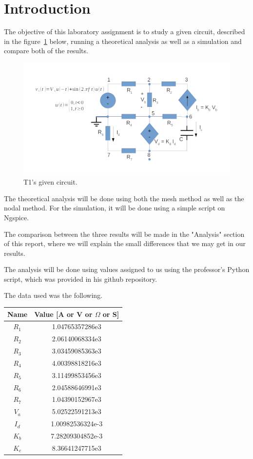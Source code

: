\section{Introduction}
\label{sec:introduction}

The objective of this laboratory assignment is to study a given circuit, described in the figure~\ref{fig:circuito} below, running a theoretical analysis as well as a simulation and compare both of the results.

\begin{figure}[H] \centering
\includegraphics[width=0.6\linewidth]{circuito.pdf}
\caption{T1's given circuit.}
\label{fig:circuito}
\end{figure}

The theoretical analysis will be done using both the mesh method as well as the nodal method. For the simulation, it will be done using a simple script on Ngspice. \par
The comparison between the three results will be made in the "Analysis" section of this report, where we will explain the small differences that we may get in our results. \par
The analysis will be done using values assigned to us using the professor's Python script, which was provided in his github repository. \par
The data used was the following.
\begin{center}
  \begin{tabular}{ | c | c | }
    \hline    
    {\bf Name} & {\bf Value [A or V or $\Omega$ or S]} \\ \hline
    $R_1$ & 1.04765357286e3 \\ \hline 
    $R_2$ & 2.06140068334e3 \\ \hline 
    $R_3$ & 3.03459085363e3 \\ \hline 
    $R_4$ & 4.00398818216e3 \\ \hline 
    $R_5$ & 3.11499853456e3 \\ \hline 
    $R_6$ & 2.04588646991e3 \\ \hline 
    $R_7$ & 1.04390152967e3 \\ \hline 
    $V_a$ & 5.02522591213e3 \\ \hline 
    $I_d$ & 1.00982536324e-3 \\ \hline
    $K_b$ & 7.28209304852e-3 \\ \hline
    $K_c$ & 8.36641247715e3 \\ 
    \hline
  \end{tabular}
\end{center}



